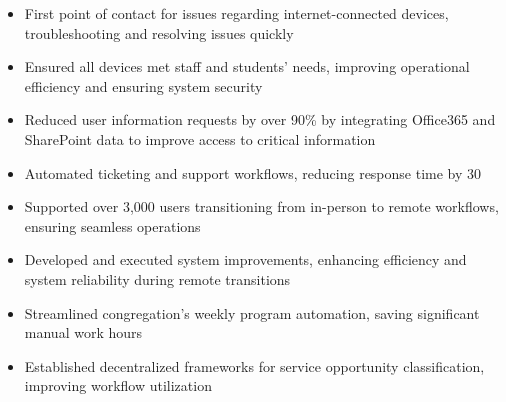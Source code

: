 \par\bigskip
{}
\par\smallskip
\begin{minipage}{13.75cm}
  \begin{minipage}{6.5cm}
    \begin{itemize}
      \item First point of contact for issues regarding internet-connected devices, troubleshooting and resolving issues quickly
      \item Ensured all devices met staff and students' needs, improving operational efficiency and ensuring system security
    \end{itemize}
  \end{minipage}
  \hfill
  \begin{minipage}{6.5cm}
    \begin{itemize}
      \item Reduced user information requests by over 90\% by integrating Office365 and SharePoint data to improve access to critical information
      \item Automated ticketing and support workflows, reducing response time by 30%
    \end{itemize}
  \end{minipage}
\end{minipage}
\par\smallskip
\divider

\par\smallskip
\begin{minipage}{13.75cm}
  \begin{minipage}{6.5cm}
    \begin{itemize}
      \item Supported over 3,000 users transitioning from in-person to remote workflows, ensuring seamless operations
      \item Developed and executed system improvements, enhancing efficiency and system reliability during remote transitions
    \end{itemize}
  \end{minipage}
  \hfill
  \begin{minipage}{6.5cm}
    \begin{itemize}
      \item Streamlined congregation's weekly program automation, saving significant manual work hours
      \item Established decentralized frameworks for service opportunity classification, improving workflow utilization
    \end{itemize}
  \end{minipage}
\end{minipage}

